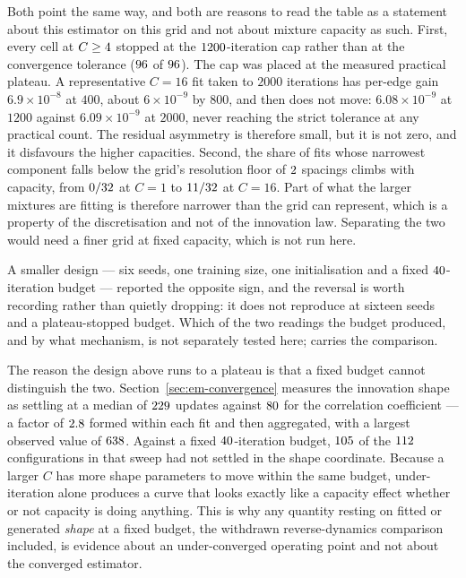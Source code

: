 \begin{remark}\label{rmk:em-capacity-caveats}
Both point the same way, and both are reasons to read the table as a statement
about this estimator on this grid and not about mixture capacity as such.
First, every cell at $C \geq 4$ stopped at the
$1200$-iteration cap rather than at the convergence tolerance
($96$ of $96$). The cap was placed at the measured
practical plateau. A representative $C=16$ fit taken to $2000$ iterations has
per-edge gain $6.9\times10^{-8}$ at $400$, about $6\times10^{-9}$ by $800$, and
then does not move: $6.08\times10^{-9}$ at $1200$ against
$6.09\times10^{-9}$ at $2000$, never reaching the strict tolerance at any
practical count. The residual asymmetry is therefore small, but it is not zero,
and it disfavours the higher capacities. Second, the share of fits whose narrowest component falls
below the grid's resolution floor of $2$ spacings climbs with
capacity, from $0/32$ at $C=1$ to
$11/32$ at $C=16$. Part of what the larger
mixtures are fitting is therefore narrower than the grid can represent, which is
a property of the discretisation and not of the innovation law. Separating the
two would need a finer grid at fixed capacity, which is not run here.
\end{remark}

\noindent A smaller design --- six seeds, one training size, one initialisation
and a fixed $40$-iteration budget --- reported the opposite sign, and
the reversal is worth recording rather than quietly dropping: it does not
reproduce at sixteen seeds and a plateau-stopped budget. Which of the two
readings the budget produced, and by what mechanism, is not separately tested
here; \compendium{} carries the comparison.

\begin{remark}\label{rmk:em-capacity-confound}
The reason the design above runs to a plateau is that a fixed budget cannot
distinguish the two. Section~\ref{sec:em-convergence} measures the innovation
shape as settling at a median of $229$ updates against
$80$ for the correlation coefficient --- a factor of $2.8$
formed within each fit and then aggregated, with a largest observed value of
$638$. Against a fixed $40$-iteration budget,
$105$ of the $112$ configurations in that sweep had not
settled in the shape coordinate. Because a larger $C$ has more shape
parameters to move within the same budget, under-iteration alone produces a
curve that looks exactly like a capacity effect whether or not capacity is doing
anything. This is why
any quantity resting on fitted or generated \emph{shape} at a fixed budget, the
withdrawn reverse-dynamics comparison included, is evidence about an
under-converged operating point and not about the converged estimator.
\end{remark}


